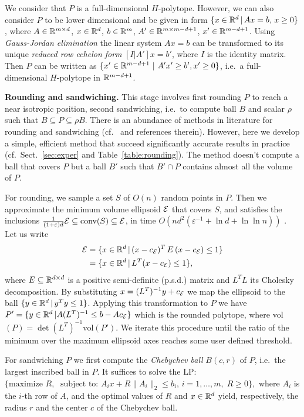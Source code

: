 \documentclass[11pt,a4paper]{article}
\def\vol{\mbox{vol}}
\def\vol{\mbox{vol}}
\begin{document}
We consider that $P$ is a full-dimensional $H$-polytope. However, we can also consider $P$ to be lower dimensional and be given in form 
$\{x\in{\mathbb R}^{d} \, |\, Ax=b,\, x\geq 0\}$, where $A\in{\mathbb R}^{m\times d}$, $x\in{\mathbb R}^{d}$,  $b\in{\mathbb R}^{m}$, $A'\in{\mathbb R}^{m\times m-d+1}$,  $x'\in{\mathbb R}^{m-d+1}$. Using {\it Gauss-Jordan elimination} the linear system $Ax=b$ can be transformed to its unique {\it reduced row echelon form} $[I|A']x=b'$, where $I$ is the identity matrix.  Then $P$ can be written as $\{x'\in\RR^{m-d+1} \ |\ A'x'\geq b', x'\geq 0\}$, i.e.\ a full-dimensional $H$-polytope in ${\mathbb R}^{m-d+1}$. 

\textbf{Rounding and sandwiching.}
This stage involves first rounding $P$ to reach a
near isotropic position, second sandwiching, i.e.\ to compute ball $B$
and scalar $\rho$ such that $B\subseteq P\subseteq\rho B$.
There is an abundance of methods in literature for rounding and sandwiching (cf.~\cite{Simonovits03} and references therein). However, here we develop a simple, efficient method that succeed significantly accurate results in practice (cf.\ Sect.~\ref{sec:exper} and Table~\ref{table:rounding}). The method doesn't compute a ball that covers $P$ but a ball $B'$ such that $B'\cap P$ contains almost all the volume of $P$.

For rounding, we sample a set $S$ of $O(n)$ random points in $P$.
Then we approximate the minimum volume ellipsoid ${\mathcal E}$ that covers $S$,
and satisfies the inclusions
$\frac{1}{(1+\varepsilon)d}{\mathcal E}\subseteq \mbox{conv}(S)\subseteq {\mathcal E}$,
in time $O(nd^2(\varepsilon^{-1}+\ln d+\ln\ln n))$ \cite{Khachiyan96}.
Let us write
\begin{align}\label{eq:ellipsoid}
 {\mathcal E}&=\{x\in{\mathbb R}^d\,|\,(x-c_{{\mathcal E}})^T\,E\,(x-c_{{\mathcal E}})\leq 1\}\nonumber\\
   &=\{x\in{\mathbb R}^d\,|\,L^T(x-c_{{\mathcal E}})\leq 1\},
\end{align}
where $E\subseteq{\mathbb R}^{d\times d}$ is a positive semi-definite (p.s.d.) matrix and
$L^TL$ its Cholesky decomposition.
By substituting $x=(L^T)^{-1}y+c_{{\mathcal E}}$ we map the ellipsoid to the ball 
$\{y\in{\mathbb R}^d\,|\,y^Ty\leq 1\}$. Applying this transformation to $P$ we have $P'=\{y\in{\mathbb R}^d\,|A(L^T)^{-1}\leq b-Ac_{\mathcal E}\}$ which is the rounded polytope,
where \vol$(P)= \det(L^T)^{-1} \vol(P')$. 
We iterate this procedure until the ratio of the minimum over the maximum ellipsoid axes reaches some user defined threshold.

For sandwiching $P$ we first compute the
{\it Chebychev ball} $B(c,r)$ of $P$, i.e.\ the largest inscribed ball in $P$.
It suffices to solve the LP:
$\{
\text{maximize } R , \; 
\text{ subject to: } A_i x+R \|A_i\|_2\leq b_i,\, i=1,\dots,m, \; R\geq 0\},
$
where $A_i$ is the $i$-th row of $A$, and
the optimal values of $R$ and $x\in{\mathbb R}^d$ yield, respectively,
the radius $r$ and the center $c$ of the Chebychev ball.
\end{document}

